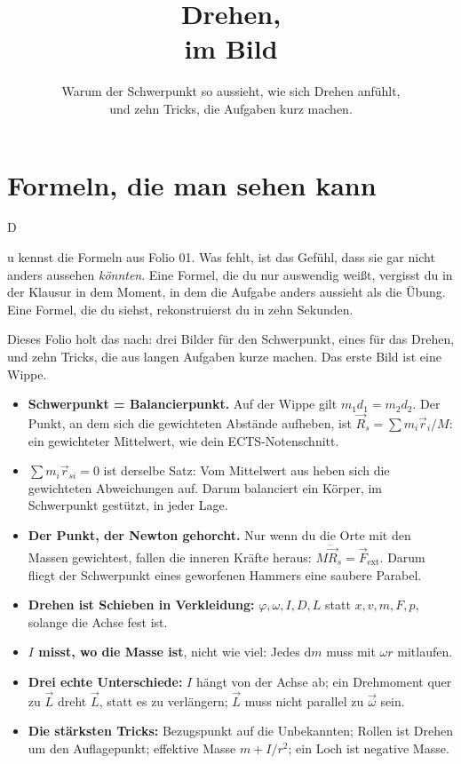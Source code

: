 \documentclass[deutsch]{kaelearn}
\title{Drehen,\\im Bild}
\subtitle{Warum der Schwerpunkt so aussieht, wie sich Drehen anfühlt,\\und zehn Tricks, die Aufgaben kurz machen.}
\newcommand\dd{\mathrm{d}}
\newcommand\ext{_{\mathrm{ext}}}
\begin{document}
\makecover

\section{Formeln, die man sehen kann}

\opening{D}{u kennst} die Formeln aus Folio 01. Was fehlt, ist das Gefühl, dass sie gar nicht anders aussehen \emph{könnten}. Eine Formel,
die du nur auswendig weißt, vergisst du in der Klausur in dem Moment, in dem die Aufgabe anders aussieht als die Übung. Eine Formel, die du
siehst, rekonstruierst du in zehn Sekunden.

Dieses Folio holt das nach: drei Bilder für den Schwerpunkt, eines für das Drehen, und zehn Tricks, die aus langen Aufgaben kurze machen.
Das erste Bild ist eine Wippe.

\begin{twominute}
\begin{itemize}
  \item \textbf{Schwerpunkt = Balancierpunkt.} Auf der Wippe gilt $m_1d_1 = m_2d_2$. Der Punkt, an dem sich die gewichteten Abstände
        aufheben, ist $\vec R_s = \sum m_i\vec r_i/M$: ein gewichteter Mittelwert, wie dein ECTS-Notenschnitt.
  \item \textbf{$\sum m_i\vec r_{si} = 0$} ist derselbe Satz: Vom Mittelwert aus heben sich die gewichteten Abweichungen auf. Darum
        balanciert ein Körper, im Schwerpunkt gestützt, in jeder Lage.
  \item \textbf{Der Punkt, der Newton gehorcht.} Nur wenn du die Orte mit den Massen gewichtest, fallen die inneren Kräfte heraus:
        $M\ddot{\vec R}_s = \vec F\ext$. Darum fliegt der Schwerpunkt eines geworfenen Hammers eine saubere Parabel.
  \item \textbf{Drehen ist Schieben in Verkleidung:} $\varphi,\omega,I,D,L$ statt $x,v,m,F,p$, solange die Achse fest ist.
  \item \textbf{$I$ misst, wo die Masse ist}, nicht wie viel: Jedes $\dd m$ muss mit $\omega r$ mitlaufen.
  \item \textbf{Drei echte Unterschiede:} $I$ hängt von der Achse ab; ein Drehmoment quer zu $\vec L$ dreht $\vec L$, statt es zu
        verlängern; $\vec L$ muss nicht parallel zu $\vec\omega$ sein.
  \item \textbf{Die stärksten Tricks:} Bezugspunkt auf die Unbekannten; Rollen ist Drehen um den Auflagepunkt; effektive Masse
        $m + I/r^2$; ein Loch ist negative Masse.
\end{itemize}
\end{twominute}
\end{document}
